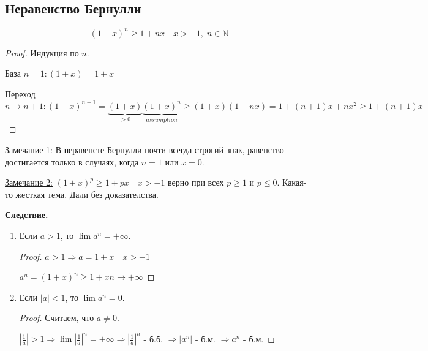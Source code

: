 \subsection{Неравенство Бернулли}
    \[ (1 + x)^n \geqslant 1 + nx \quad x > -1,\; n \in \mathbb{N} \]
    \begin{proof}
        Индукция по $n$.
        
        База $n = 1: (1 + x) = 1 + x$
        
        Переход $n \to n + 1: (1 + x)^{n + 1} = \underbrace{(1 + x)}_{> 0}\underbrace{(1 + x)^n}_{assumption} \geqslant (1 + x)(1 + nx) = 1 + (n + 1)x + nx^2 \geqslant 1 + (n + 1)x$
    \end{proof}
    \underline{Замечание 1:} В неравенсте Бернулли почти всегда строгий знак, равенство достигается только в случаях, когда $n = 1$ или $x = 0$.
    
    \underline{Замечание 2:} $(1 + x)^p \geqslant 1 + px \quad x > -1$ верно при всех $p \geqslant 1$ и $p \leqslant 0$. Какая-то жесткая тема. Дали без доказателства.
    \vspace{0.5cm}
    
    \textbf{Следствие.} 
    \begin{enumerate}
        \item Если $a > 1$, то $\lim a^n = +\infty$.
        \begin{proof}
            $a > 1 \Rightarrow a = 1 + x \quad x > -1$
            
            $a^n = (1 + x)^n \geqslant 1 + xn \to +\infty$
        \end{proof}
        \item Если $|a| < 1$, то $\lim a^n = 0$.
        \begin{proof}
            Считаем, что $a \neq 0$.
            
            $|\frac{1}{a}| > 1 \Rightarrow \lim |\frac{1}{a}|^n = +\infty \Rightarrow |\frac{1}{a}|^n$ - б.б. $\Rightarrow |a^n|$ - б.м. $\Rightarrow a^n$ - б.м.
        \end{proof}
    \end{enumerate}